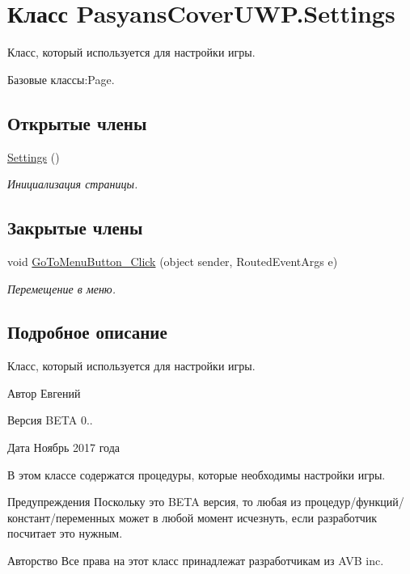 \hypertarget{class_pasyans_cover_u_w_p_1_1_settings}{}\section{Класс Pasyans\+Cover\+U\+W\+P.\+Settings}
\label{class_pasyans_cover_u_w_p_1_1_settings}


Класс, который используется для настройки игры.  




Базовые классы\+:Page.

\subsection*{Открытые члены}
\begin{DoxyCompactItemize}
\item 
\hyperlink{class_pasyans_cover_u_w_p_1_1_settings_a9c5e95d329e9558919c3ad332dae7e6b}{Settings} ()
\begin{DoxyCompactList}\small\item\em Инициализация страницы. \end{DoxyCompactList}\end{DoxyCompactItemize}
\subsection*{Закрытые члены}
\begin{DoxyCompactItemize}
\item 
void \hyperlink{class_pasyans_cover_u_w_p_1_1_settings_a24250ce46e7309d4f1fbf50e94a5ecee}{Go\+To\+Menu\+Button\+\_\+\+Click} (object sender, Routed\+Event\+Args e)
\begin{DoxyCompactList}\small\item\em Перемещение в меню. \end{DoxyCompactList}\end{DoxyCompactItemize}


\subsection{Подробное описание}
Класс, который используется для настройки игры. 

\begin{DoxyAuthor}{Автор}
Евгений 
\end{DoxyAuthor}
\begin{DoxyVersion}{Версия}
B\+E\+TA 0.. 
\end{DoxyVersion}
\begin{DoxyDate}{Дата}
Ноябрь 2017 года
\end{DoxyDate}
В этом классе содержатся процедуры, которые необходимы настройки игры. \begin{DoxyWarning}{Предупреждения}
Поскольку это B\+E\+TA версия, то любая из процедур/функций/констант/переменных может в любой момент исчезнуть, если разработчик посчитает это нужным. 
\end{DoxyWarning}
\begin{DoxyCopyright}{Авторство}
Все права на этот класс принадлежат разработчикам из A\+VB inc. 
\end{DoxyCopyright}


